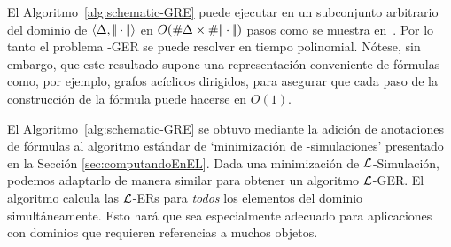 


El Algoritmo~\ref{alg:schematic-GRE} puede ejecutar en un subconjunto arbitrario del dominio de $\langle \Delta,|\!|\cdot|\!| \rangle$
 en $O(\# \Delta\times\# |\!|\cdot|\!|)$ pasos como se muestra en~\cite{HHK95}. Por lo tanto el problema \EL-GER se puede resolver en tiempo polinomial. N\'otese, sin embargo, que este resultado supone una representaci\'on conveniente de
f\'ormulas como, por ejemplo, grafos ac\'iclicos dirigidos, para asegurar que
cada paso de la construcci\'on de la f\'ormula puede hacerse en $O(1)$. %


%


El Algoritmo~\ref{alg:schematic-GRE} se obtuvo mediante la adici\'on de anotaciones de f\'ormulas
al algoritmo est\'andar de `minimizaci\'on de \EL-simulaciones' presentado en la Secci\'on \ref{sec:computandoEnEL}. Dada una minimizaci\'on de
$\mathcal{L}$-Simulaci\'on, podemos adaptarlo de
manera similar para obtener un algoritmo $\mathcal{L}$-GER.
El algoritmo calcula las $\mathcal{L}$-ERs para \emph{todos} los elementos del
dominio simult\'aneamente.
Esto har\'a que sea especialmente adecuado para aplicaciones con
dominios que requieren referencias a muchos objetos.

